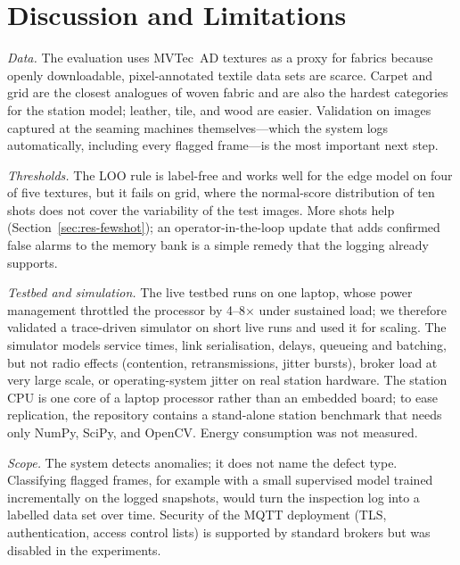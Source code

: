 \section{Discussion and Limitations}\label{sec:discussion}

\emph{Data.} The evaluation uses MVTec~AD textures as a proxy for fabrics because openly downloadable, pixel-annotated textile data sets are scarce. Carpet and grid are the closest analogues of woven fabric and are also the hardest categories for the station model; leather, tile, and wood are easier. Validation on images captured at the seaming machines themselves---which the system logs automatically, including every flagged frame---is the most important next step.

\emph{Thresholds.} The LOO rule is label-free and works well for the edge model on four of five textures, but it fails on grid, where the normal-score distribution of ten shots does not cover the variability of the test images. More shots help (Section~\ref{sec:res-fewshot}); an operator-in-the-loop update that adds confirmed false alarms to the memory bank is a simple remedy that the logging already supports.

\emph{Testbed and simulation.} The live testbed runs on one laptop, whose power management throttled the processor by 4--8$\times$ under sustained load; we therefore validated a trace-driven simulator on short live runs and used it for scaling. The simulator models service times, link serialisation, delays, queueing and batching, but not radio effects (contention, retransmissions, jitter bursts), broker load at very large scale, or operating-system jitter on real station hardware. The station CPU is one core of a laptop processor rather than an embedded board; to ease replication, the repository contains a stand-alone station benchmark that needs only NumPy, SciPy, and OpenCV. Energy consumption was not measured.

\emph{Scope.} The system detects anomalies; it does not name the defect type. Classifying flagged frames, for example with a small supervised model trained incrementally on the logged snapshots, would turn the inspection log into a labelled data set over time. Security of the MQTT deployment (TLS, authentication, access control lists) is supported by standard brokers but was disabled in the experiments.
